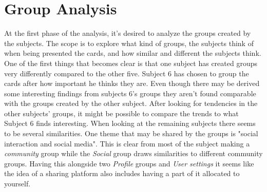 \section{Group Analysis}
\label{GroupAnalysis}
%
At the first phase of the analysis, it's desired to analyze the groups created by the subjects. The scope is to explore what kind of groups, the subjects think of when being presented the cards, and how similar and different the subjects think. One of the first things that becomes clear is that one subject has created groups very differently compared to the other five. Subject 6 has chosen to group the cards after how important he thinks they are. Even though there may be derived some interesting findings from subjects 6's groups they aren't found comparable with the groups created by the other subject. After looking for tendencies in the other subjects' groups, it might be possible to compare the trends to what Subject 6 finds interesting. When looking at the remaining subjects there seems to be several similarities. One theme that may be shared by the groups is "social interaction and social media". This is clear from most of the subject making a \textit{community} group while the \textit{Social} group draws similarities to different community groups. Having this alongside two \textit{Profile} groups and \textit{User settings} it seems like the idea of a sharing platform also includes having a part of it allocated to yourself. \\

